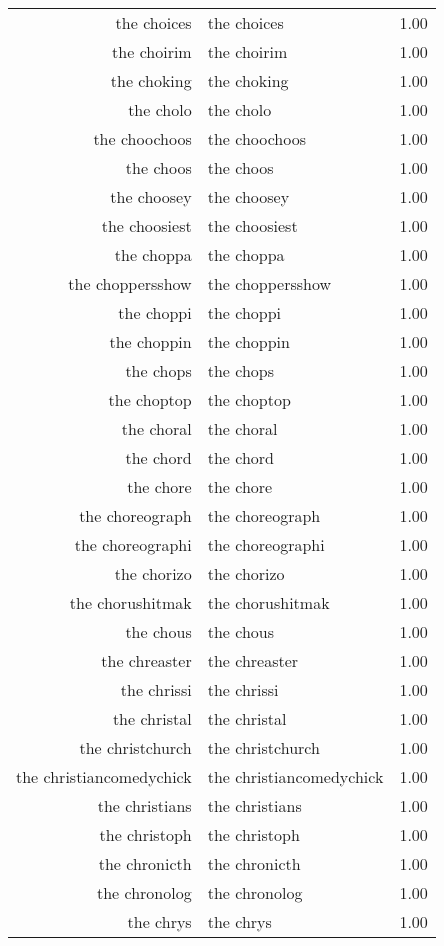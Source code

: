 \begin{table}[ht]
\begin{tabular}{rlr}
  the choices & the choices & 1.00 \\ 
  the choirim & the choirim & 1.00 \\ 
  the choking & the choking & 1.00 \\ 
  the cholo & the cholo & 1.00 \\ 
  the choochoos & the choochoos & 1.00 \\ 
  the choos & the choos & 1.00 \\ 
  the choosey & the choosey & 1.00 \\ 
  the choosiest & the choosiest & 1.00 \\ 
  the choppa & the choppa & 1.00 \\ 
  the choppersshow & the choppersshow & 1.00 \\ 
  the choppi & the choppi & 1.00 \\ 
  the choppin & the choppin & 1.00 \\ 
  the chops & the chops & 1.00 \\ 
  the choptop & the choptop & 1.00 \\ 
  the choral & the choral & 1.00 \\ 
  the chord & the chord & 1.00 \\ 
  the chore & the chore & 1.00 \\ 
  the choreograph & the choreograph & 1.00 \\ 
  the choreographi & the choreographi & 1.00 \\ 
  the chorizo & the chorizo & 1.00 \\ 
  the chorushitmak & the chorushitmak & 1.00 \\ 
  the chous & the chous & 1.00 \\ 
  the chreaster & the chreaster & 1.00 \\ 
  the chrissi & the chrissi & 1.00 \\ 
  the christal & the christal & 1.00 \\ 
  the christchurch & the christchurch & 1.00 \\ 
  the christiancomedychick & the christiancomedychick & 1.00 \\ 
  the christians & the christians & 1.00 \\ 
  the christoph & the christoph & 1.00 \\ 
  the chronicth & the chronicth & 1.00 \\ 
  the chronolog & the chronolog & 1.00 \\ 
  the chrys & the chrys & 1.00 \\ 

\end{tabular}
\end{table}

